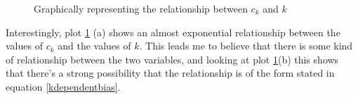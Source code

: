 \documentclass{report}
\begin{document}
\begin{figure}
\caption{Graphically representing the relationship between $c_{k}$ and $k$} \label{c_k_normal}
\end{figure}

Interestingly, plot \ref{c_k_normal} (a) shows an almost exponential relationship between the values of $c_{k}$ and the values of $k$. This leads me to believe that there is some kind of relationship between the two variables, and looking at plot \ref{c_k_normal}(b) this shows that there's a strong possibility that the relationship is of the form stated in equation \ref{kdependentbias}.
\end{document}

